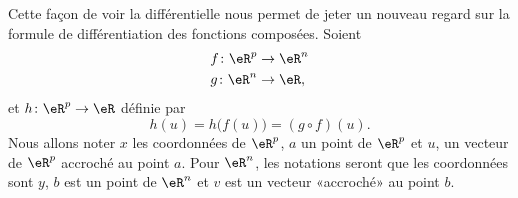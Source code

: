 Cette façon de voir la différentielle nous permet de jeter un nouveau regard sur la formule de différentiation des fonctions composées. Soient
\begin{equation}
    \begin{aligned}[]
        f\colon \eR^p&\to \eR^n\\
        g\colon \eR^n&\to \eR,
    \end{aligned}
\end{equation}
et $h\colon \eR^p\to \eR$ définie par
\begin{equation}
    h(u)=h\big( f(u) \big)=(g\circ f)(u).
\end{equation}
Nous allons noter $x$ les coordonnées de $\eR^p$, $a$ un point de $\eR^p$ et $u$, un vecteur de $\eR^p$ accroché au point $a$. Pour $\eR^n$, les notations seront que les coordonnées sont $y$, $b$ est un point de $\eR^n$ et $v$ est un vecteur «accroché» au point $b$.

